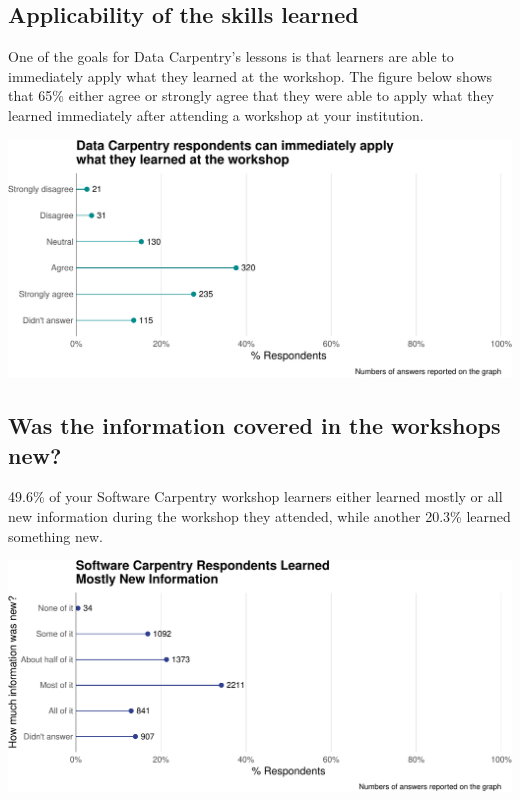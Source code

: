 \documentclass[]{article}
\makeatletter
\def\maxwidth{\ifdim\Gin@nat@width>\linewidth\linewidth\else\Gin@nat@width\fi}
\makeatother
\begin{document}
\subsection{Applicability of the skills
learned}\label{applicability-of-the-skills-learned}

One of the goals for Data Carpentry's lessons is that learners are able
to immediately apply what they learned at the workshop. The figure below
shows that 65\% either agree or strongly agree that they were able to
apply what they learned immediately after attending a workshop at your
institution.

\includegraphics[width=\maxwidth]{../figures/dc-skill-applicability-plot-1}

\subsection{Was the information covered in the workshops
new?}\label{was-the-information-covered-in-the-workshops-new}

49.6\% of your Software Carpentry workshop learners either learned
mostly or all new information during the workshop they attended, while
another 20.3\% learned something new.

\includegraphics[width=\maxwidth]{../figures/swc-new-information-plot-1}
\end{document}
